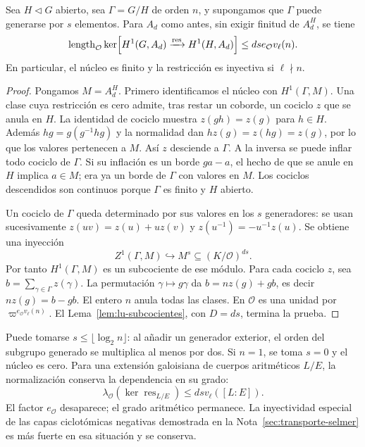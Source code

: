 \begin{teorema}
\label{thm:lu-restriccion}
Sea $H\triangleleft G$ abierto, sea $\Gamma=G/H$ de orden $n$,
y supongamos que $\Gamma$ puede generarse por $s$ elementos.
Para $A_d$ como antes, sin exigir finitud de $A_d^H$, se tiene
\begin{equation}
 \operatorname{length}_{\mathcal O}\ker\!\left[
 H^1(G,A_d)\xrightarrow{\operatorname{res}}H^1(H,A_d)\right]
       \le d s e_{\mathcal O}v_\ell(n).
 \label{eq:lu-restriccion}
\end{equation}
En particular, el núcleo es finito y la restricción es inyectiva
si $\ell\nmid n$.
\end{teorema}
\begin{proof}
Pongamos $M=A_d^H$. Primero identificamos el núcleo con
$H^1(\Gamma,M)$. Una clase cuya restricción es cero admite,
tras restar un coborde, un cociclo $z$ que se anula en $H$.
La identidad de cociclo muestra $z(gh)=z(g)$ para $h\in H$.
Además $hg=g(g^{-1}hg)$ y la normalidad dan
$hz(g)=z(hg)=z(g)$, por lo que los valores pertenecen a $M$.
Así $z$ desciende a $\Gamma$. A la inversa se puede inflar todo
cociclo de $\Gamma$. Si su inflación es un borde $ga-a$, el
hecho de que se anule en $H$ implica $a\in M$; era ya un borde
de $\Gamma$ con valores en $M$. Los cociclos descendidos son
continuos porque $\Gamma$ es finito y $H$ abierto.

Un cociclo de $\Gamma$ queda determinado por sus valores en los
$s$ generadores: se usan sucesivamente
$z(uv)=z(u)+uz(v)$ y $z(u^{-1})=-u^{-1}z(u)$.
Se obtiene una inyección
\[
 Z^1(\Gamma,M)\hookrightarrow M^s\subseteq(K/\mathcal O)^{ds}.
\]
Por tanto $H^1(\Gamma,M)$ es un subcociente de ese módulo.
Para cada cociclo $z$, sea $b=\sum_{\gamma\in\Gamma}z(\gamma)$.
La permutación $\gamma\mapsto g\gamma$ da
$b=nz(g)+gb$, es decir $nz(g)=b-gb$. El entero $n$ anula todas
las clases. En $\mathcal O$ es una unidad por
$\varpi^{e_{\mathcal O}v_\ell(n)}$. El
Lema~\ref{lem:lu-subcocientes}, con $D=ds$, termina la prueba.
\end{proof}

Puede tomarse $s\le\lfloor\log_2 n\rfloor$: al añadir un
generador exterior, el orden del subgrupo generado se multiplica
al menos por dos. Si $n=1$, se toma $s=0$ y el núcleo es cero.
Para una extensión galoisiana de cuerpos aritméticos $L/E$, la
normalización conserva la dependencia en su grado:
\begin{equation}
 \lambda_{\mathcal O}(\ker\operatorname{res}_{L/E})
       \le d s v_\ell([L:E]).
 \label{eq:lu-restriccion-normalizada}
\end{equation}
El factor $e_{\mathcal O}$ desaparece; el grado aritmético
permanece. La inyectividad especial de las capas ciclotómicas
negativas demostrada en la Nota~\ref{sec:transporte-selmer}
es más fuerte en esa situación y se conserva.

